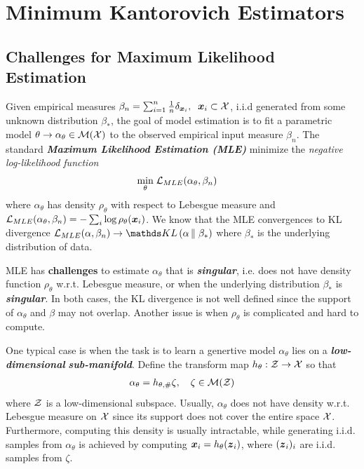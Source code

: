 \documentclass[11pt]{article}
\begin{document}
\section{Minimum Kantorovich Estimators}
\subsection{Challenges for Maximum Likelihood Estimation}
Given empirical measures $\beta_{n} = \sum_{i=1}^{n}\frac{1}{n}\delta_{\boldsymbol{x}_{i}}, \;\; \boldsymbol{x}_i \subset {\mathcal X}$, i.i.d generated from some unknown distribution $\beta_{*}$, the goal of model estimation is to fit a parametric model $\theta \rightarrow  \alpha_{\theta} \in {\mathcal M}({\mathcal X})$ to the observed empirical input measure $\beta_{n}$. The standard \emph{\textbf{Maximum Likelihood Estimation (MLE)}} minimize the \emph{negative log-likelihood function} 
\begin{align*}
\min_{\theta}\;&{\mathcal L}_{MLE}(\alpha_{\theta}, \beta_{n})
\end{align*} where $\alpha_{\theta}$ has density $\rho_{\theta}$ with respect to Lebesgue measure and ${\mathcal L}_{MLE}(\alpha_{\theta}, \beta_{n}) = -\sum_i \log \rho_{\theta}(\boldsymbol{x}_i)$. We know that the MLE convergences to KL divergence $\cL_{MLE}(\alpha, \beta_{n}) \rightarrow \kl{\alpha}{\beta_{*}}$ where $\beta_{*}$ is the underlying distribution of data.

MLE has \textbf{challenges} to estimate $\alpha_{\theta}$ that is \emph{\textbf{singular}}, i.e. does not have density function $\rho_{\theta}$ w.r.t.  Lebesgue measure, or when the underlying distribution $\beta_{*}$ is \emph{\textbf{singular}}. In both cases, the KL divergence is not well defined since the support of $\alpha_{\theta}$ and $\beta$ may not overlap. Another issue is when $\rho_{\theta}$ is complicated and hard to compute. 

One typical case is when the task is to learn a genertive model $\alpha_{\theta}$ lies on a \emph{\textbf{low-dimensional}} \emph{\textbf{sub-manifold}}. Define the transform map $h_{\theta}: {\mathcal Z} \rightarrow {\mathcal X}$ so that 
\begin{align*}
\alpha_{\theta} = h_{\theta, \#}\zeta, \quad \zeta \in {\mathcal M}({\mathcal Z})
\end{align*} where ${\mathcal Z}$ is a low-dimensional subspace.  Usually, $\alpha_{\theta}$ does not have density w.r.t. Lebesgue measure on ${\mathcal X}$ since its support does not cover the entire space ${\mathcal X}$. Furthermore, computing this density is usually intractable, while generating i.i.d. samples from $\alpha_{\theta}$ is achieved by computing $\boldsymbol{x}_i = h_{\theta}(\boldsymbol{z}_i)$, where $(\boldsymbol{z}_i)_i$ are i.i.d. samples from $\zeta$. 
\end{document}
